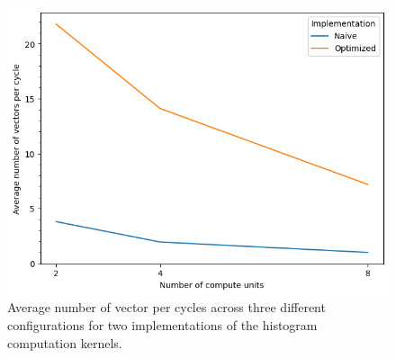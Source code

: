 \documentclass[10pt]{article}
\begin{document}
\begin{figure}[htbp]
    \centering
    \includegraphics[width=0.6\linewidth]{images/task1/rs4-t1-avg-vectors-per-cycle.png}
    \caption{Average number of vector per cycles across three different configurations for two implementations of the histogram computation kernels.}
    \label{fig:task1:vpc}
\end{figure}
\end{document}
